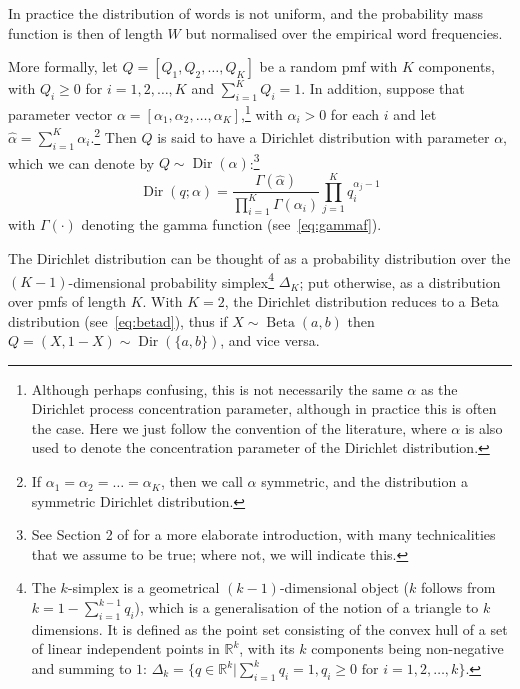In practice the distribution of words is not uniform, and the probability mass function is then of length $W$ but normalised over the empirical word frequencies. 

More formally, let $Q = [Q_1, Q_2, \ldots, Q_K]$ be a random pmf with $K$ components, with $Q_i \geq 0$ for $i = 1,2,\ldots,K$ and $\sum_{i=1}^K Q_i = 1$. In addition, suppose that parameter vector $\alpha = [\alpha_1,\alpha_2,\ldots,\alpha_K]$,\footnote{Although perhaps confusing, this is not necessarily the same $\alpha$ as the Dirichlet process concentration parameter, although in practice this is often the case. Here we just follow the convention of the literature, where $\alpha$ is also used to denote the concentration parameter of the Dirichlet distribution.} with $\alpha_i > 0$ for each $i$ and let $\hat{\alpha} = \sum_{i=1}^K \alpha_i$.\footnote{If $\alpha_1=\alpha_2=\ldots=\alpha_K$, then we call $\alpha$ symmetric, and the distribution a symmetric Dirichlet distribution.} Then $Q$ is said to have a Dirichlet distribution with parameter $\alpha$, which we can denote by $Q \sim \operatorname{Dir}(\alpha)$:\footnote{See Section 2 of \citet{Ferguson1973A} for a more elaborate introduction, with many technicalities that we assume to be true; where not, we will indicate this.\cite{Ferguson1973A}}
\begin{equation}
	\operatorname{Dir}(q; \alpha) = \frac{\Gamma(\hat{\alpha})}{\prod_{i=1}^K \Gamma(\alpha_i)} \prod_{j=1}^K q_i^{\alpha_j-1}
\end{equation}
with $\Gamma(\cdot)$ denoting the gamma function (see~\cref{eq:gammaf}).

The Dirichlet distribution can be thought of as a probability distribution over the $(K-1)$-dimensional probability simplex\footnote{The $k$-simplex is a geometrical $(k-1)$-dimensional object ($k$ follows from $k=1-\sum_{i=1}^{k-1} q_i$), which is a generalisation of the notion of a triangle to $k$ dimensions. It is defined as the point set consisting of the convex hull of a set of linear independent points in $\mathbb{R}^k$, with its $k$ components being non-negative and summing to $1$: $\Delta_k = \{q\in\mathbb{R}^k|\sum_{i=1}^k q_i=1,q_i\geq0\text{ for }i=1,2,\ldots,k\}$.} $\Delta_K$; put otherwise, as a distribution over pmfs of length $K$. With $K=2$, the Dirichlet distribution reduces to a Beta distribution (see~\cref{eq:betad}), thus if $X\sim\operatorname{Beta}(a,b)$ then $Q=(X,1-X)\sim\operatorname{Dir}(\{a,b\})$, and vice versa.

